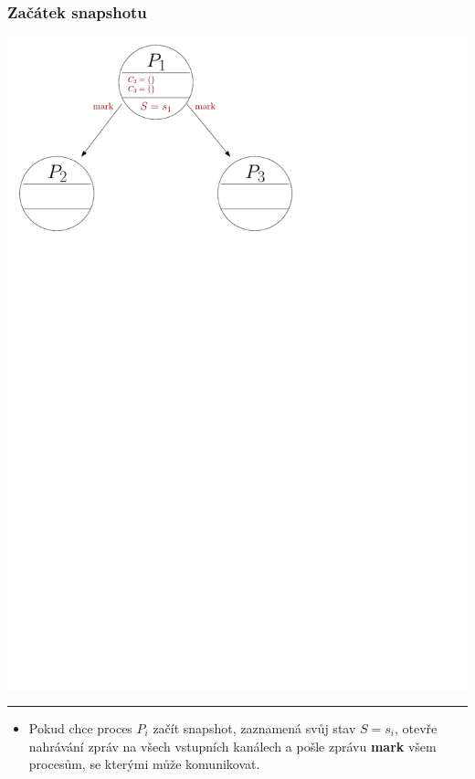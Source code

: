 \documentclass[usenames,dvipsnames,9pt]{beamer}
\begin{document}
\newcommand\snapsize{0.65}
\begin{frame}
\frametitle{Začátek snapshotu}
	\vspace{1.8em}
	\begin{center}
		\includegraphics[width=\snapsize\linewidth]{13/figs/snapshot1.pdf}%
	\end{center}

	{
		\vspace{2em}\hrule\vspace{1em}
		\begin{itemize}
			\item Pokud chce proces $P_i$ začít snapshot, zaznamená svůj stav $S=s_i$, otevře nahrávání zpráv na všech vstupních kanálech a pošle zprávu {\bf mark} všem procesům, se kterými může komunikovat.
		\end{itemize}
	}
	\vfill

\end{frame}
\end{document}
